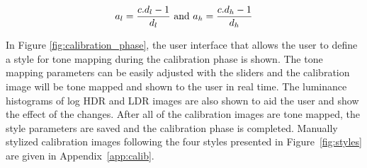 \begin{equation}
    a_l = {{c . d_l-1} \over {d_l}} \text{ and } a_h = {{c . d_h-1} \over {d_h}}
\end{equation}

In Figure \ref{fig:calibration_phase}, the user interface that allows the user to define a style for tone mapping during the calibration phase is shown. The tone mapping parameters can be easily adjusted with the sliders and the calibration image will be tone mapped and shown to the user in real time. The luminance histograms of log HDR and LDR images are also shown to aid the user and show the effect of the changes. After all of the calibration images are tone mapped, the style parameters are saved and the calibration phase is completed. Manually stylized calibration images following the four styles presented in Figure~\ref{fig:styles} are given in Appendix~\ref{app:calib}.


